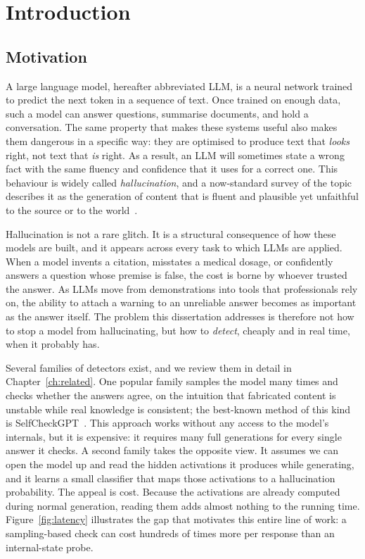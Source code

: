 \chapter{Introduction}
\label{ch:intro}

\section{Motivation}

A large language model, hereafter abbreviated LLM, is a neural network trained to
predict the next token in a sequence of text. Once trained on enough data, such a model
can answer questions, summarise documents, and hold a conversation. The same property
that makes these systems useful also makes them dangerous in a specific way: they are
optimised to produce text that \emph{looks} right, not text that \emph{is} right. As a
result, an LLM will sometimes state a wrong fact with the same fluency and confidence
that it uses for a correct one. This behaviour is widely called \emph{hallucination},
and a now-standard survey of the topic describes it as the generation of content that
is fluent and plausible yet unfaithful to the source or to the world~\cite{ji2023survey}.

Hallucination is not a rare glitch. It is a structural consequence of how these models
are built, and it appears across every task to which LLMs are applied. When a model
invents a citation, misstates a medical dosage, or confidently answers a question whose
premise is false, the cost is borne by whoever trusted the answer. As LLMs move from
demonstrations into tools that professionals rely on, the ability to attach a warning
to an unreliable answer becomes as important as the answer itself. The problem this
dissertation addresses is therefore not how to stop a model from hallucinating, but how
to \emph{detect}, cheaply and in real time, when it probably has.

Several families of detectors exist, and we review them in detail in
Chapter~\ref{ch:related}. One popular family samples the model many times and checks
whether the answers agree, on the intuition that fabricated content is unstable while
real knowledge is consistent; the best-known method of this kind is
SelfCheckGPT~\cite{manakul2023selfcheckgpt}. This approach works without any access to
the model's internals, but it is expensive: it requires many full generations for every
single answer it checks. A second family takes the opposite view. It assumes we can open
the model up and read the hidden activations it produces while generating, and it learns
a small classifier that maps those activations to a hallucination probability. The
appeal is cost. Because the activations are already computed during normal generation,
reading them adds almost nothing to the running time. Figure~\ref{fig:latency}
illustrates the gap that motivates this entire line of work: a sampling-based check can
cost hundreds of times more per response than an internal-state probe.

